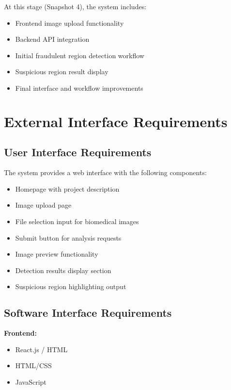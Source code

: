 \documentclass[12pt]{article}
\begin{document}
At this stage (Snapshot 4), the system includes:

\begin{itemize}
    \item Frontend image upload functionality
    \item Backend API integration
    \item Initial fraudulent region detection workflow
    \item Suspicious region result display
    \item Final interface and workflow improvements
\end{itemize}

\section{External Interface Requirements}

\subsection{User Interface Requirements}

The system provides a web interface with the following components:

\begin{itemize}
    \item Homepage with project description
    \item Image upload page
    \item File selection input for biomedical images
    \item Submit button for analysis requests
    \item Image preview functionality
    \item Detection results display section
    \item Suspicious region highlighting output
\end{itemize}

\subsection{Software Interface Requirements}

\textbf{Frontend:}

\begin{itemize}
    \item React.js / HTML
    \item HTML/CSS
    \item JavaScript
\end{itemize}
\end{document}
